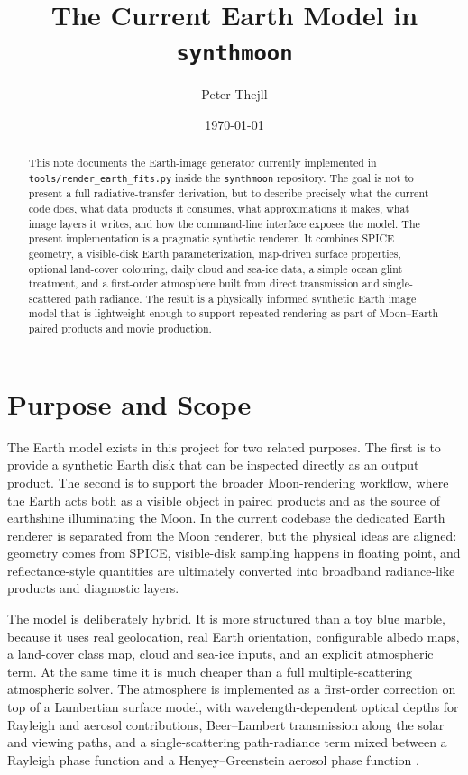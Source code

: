 \documentclass[12pt,a4paper]{article}
\title{The Current Earth Model in \texttt{synthmoon}}
\author{Peter Thejll}
\date{\today}
\begin{document}
\maketitle

\begin{abstract}
This note documents the Earth-image generator currently implemented in \texttt{tools/render\_earth\_fits.py} inside the \texttt{synthmoon} repository. The goal is not to present a full radiative-transfer derivation, but to describe precisely what the current code does, what data products it consumes, what approximations it makes, what image layers it writes, and how the command-line interface exposes the model. The present implementation is a pragmatic synthetic renderer. It combines SPICE geometry, a visible-disk Earth parameterization, map-driven surface properties, optional land-cover colouring, daily cloud and sea-ice data, a simple ocean glint treatment, and a first-order atmosphere built from direct transmission and single-scattered path radiance. The result is a physically informed synthetic Earth image model that is lightweight enough to support repeated rendering as part of Moon--Earth paired products and movie production.
\end{abstract}

\section{Purpose and Scope}
The Earth model exists in this project for two related purposes. The first is to provide a synthetic Earth disk that can be inspected directly as an output product. The second is to support the broader Moon-rendering workflow, where the Earth acts both as a visible object in paired products and as the source of earthshine illuminating the Moon. In the current codebase the dedicated Earth renderer is separated from the Moon renderer, but the physical ideas are aligned: geometry comes from SPICE, visible-disk sampling happens in floating point, and reflectance-style quantities are ultimately converted into broadband radiance-like products and diagnostic layers.

The model is deliberately hybrid. It is more structured than a toy blue marble, because it uses real geolocation, real Earth orientation, configurable albedo maps, a land-cover class map, cloud and sea-ice inputs, and an explicit atmospheric term. At the same time it is much cheaper than a full multiple-scattering atmospheric solver. The atmosphere is implemented as a first-order correction on top of a Lambertian surface model, with wavelength-dependent optical depths for Rayleigh and aerosol contributions, Beer--Lambert transmission along the solar and viewing paths, and a single-scattering path-radiance term mixed between a Rayleigh phase function and a Henyey--Greenstein aerosol phase function \parencite{acton1996,henyey1941,bucholtz1995,cox1954}.
\end{document}
